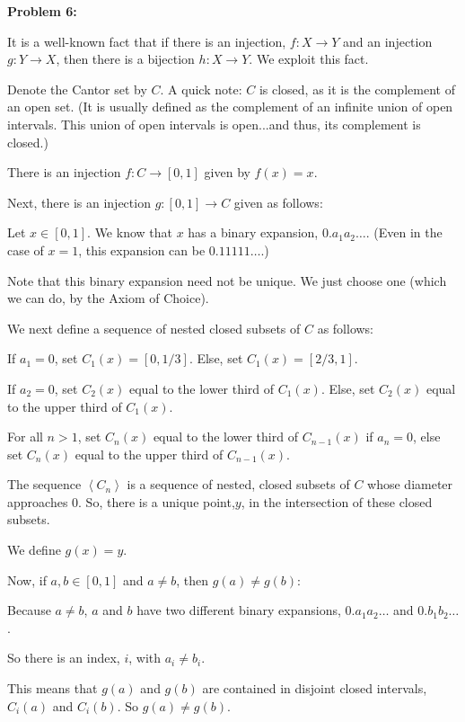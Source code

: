\documentclass[a4paper,12pt]{article}
\newcommand{\tab}{\hspace{4mm}} %
\newcommand{\shunt}{\vspace{20mm}}
\newcommand{\anbrack}[1]{\left\langle #1 \right\rangle}
\begin{document}
\tab %

\shunt

{\bf Problem 6:}

It is a well-known fact that if there is an injection, $f: X \to Y$ and an injection $g: Y \to X$, then there is a bijection $h: X \to Y$. We exploit this fact.

Denote the Cantor set by $C$. A quick note: $C$ is closed, as it is the complement of an open set. (It is usually defined as the complement of an infinite union of open intervals. This union of open intervals is open...and thus, its complement is closed.)

There is an injection $f: C \to [0,1]$ given by $f(x) = x$.

Next, there is an injection $g: [0,1] \to C$ given as follows:

\tab Let $x \in [0,1]$. We know that $x$ has a binary expansion, $0.a_1a_2 \ldots$. (Even in the case of $x=1$, this expansion can be $0.11111\ldots$.)

\tab Note that this binary expansion need not be unique. We just choose one (which we can do, by the Axiom of Choice).

\tab We next define a sequence of nested closed subsets of $C$ as follows:

\tab \tab If $a_1= 0$, set $C_1(x) = [0,1/3]$. Else, set $C_1(x) = [2/3,1]$.

\tab \tab If $a_2 = 0$, set $C_2(x)$ equal to the lower third of $C_1(x)$. Else, set $C_2(x)$ equal to the upper third of $C_1(x)$.

\tab \tab For all $n > 1$, set $C_n(x)$ equal to the lower third of $C_{n-1}(x)$ if $a_n = 0$, else set $C_n(x)$ equal to the upper third of $C_{n-1}(x)$.

\tab The sequence $\anbrack{C_n}$ is a sequence of nested, closed subsets of $C$ whose diameter approaches $0$. So, there is a unique point,$y$, in the intersection of these closed subsets.

\tab We define $g(x) = y$.

\tab Now, if $a, b \in [0,1]$ and $a \neq b$, then $g(a) \neq g(b)$:

\tab \tab Because $a \neq b$, $a$ and $b$ have two different binary expansions, $0.a_1a_2 \ldots $ and $0.b_1b_2 \ldots$.

\tab \tab So there is an index, $i$, with $a_i \neq b_i$.

\tab \tab This means that $g(a)$ and $g(b)$ are contained in disjoint closed intervals, $C_i(a)$ and $C_i(b)$. So $g(a) \neq g(b)$.
\end{document}
